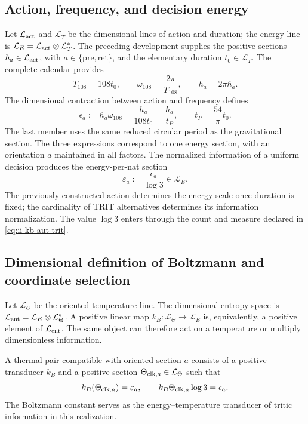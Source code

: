 \subsection{Action, frequency, and decision energy}

Let \(\mathcal L_{\rm act}\) and \(\mathcal L_T\) be the dimensional
lines of action and duration; the energy line is
\(\mathcal L_E=\mathcal L_{\rm act}\otimes\mathcal L_T^*\).
The preceding development supplies the positive sections
\(\hbar_a\in\mathcal L_{\rm act}\), with
\(a\in\{\mathrm{pre},\mathrm{ret}\}\), and the elementary duration
\(t_0\in\mathcal L_T\). The complete calendar provides
\[
 T_{108}=108t_0,\qquad
 \omega_{108}=\frac{2\pi}{T_{108}},\qquad
 h_a=2\pi\hbar_a.
\]
The dimensional contraction between action and frequency defines
\begin{equation}
 \epsilon_a:=\hbar_a\omega_{108}
 =\frac{h_a}{108t_0}
 =\frac{\hbar_a}{t_P},\qquad
 t_P=\frac{54}{\pi}t_0.
 \label{eq:ii-kb-aut-energia}
\end{equation}
The last member uses the same reduced circular period as the
gravitational section. The three expressions correspond to one
energy section, with an orientation \(a\) maintained in all
factors. The normalized information of a uniform decision
produces the energy-per-nat section
\begin{equation}
 \varepsilon_a:=\frac{\epsilon_a}{\log3}\in\mathcal L_E^+.
 \label{eq:ii-kb-aut-energia-nat}
\end{equation}
The previously constructed action determines the energy scale once
duration is fixed; the cardinality of TRIT alternatives determines its
information normalization. The value \(\log3\) enters through the
count and measure declared in \eqref{eq:ii-kb-aut-trit}.

\subsection{Dimensional definition of Boltzmann and coordinate selection}

Let \(\mathcal L_\Theta\) be the oriented temperature line.
The dimensional entropy space is
\(\mathcal L_{\rm ent}=\mathcal L_E\otimes\mathcal L_\Theta^*\).
A positive linear map
\(k_B:\mathcal L_\Theta\to\mathcal L_E\) is, equivalently,
a positive element of \(\mathcal L_{\rm ent}\). The same
object can therefore act on a temperature or multiply dimensionless
information.

\begin{definition}
A thermal pair compatible with oriented section \(a\) consists of
a positive transducer \(k_B\) and a positive section
\(\Theta_{{\rm clk},a}\in\mathcal L_\Theta\) such that
\begin{equation}
 k_B(\Theta_{{\rm clk},a})=\varepsilon_a,
 \qquad
 k_B\Theta_{{\rm clk},a}\log3=\epsilon_a.
 \label{eq:ii-kb-aut-par-termico}
\end{equation}
The Boltzmann constant serves as the energy--temperature
transducer of tritic information in this realization.
\end{definition}

